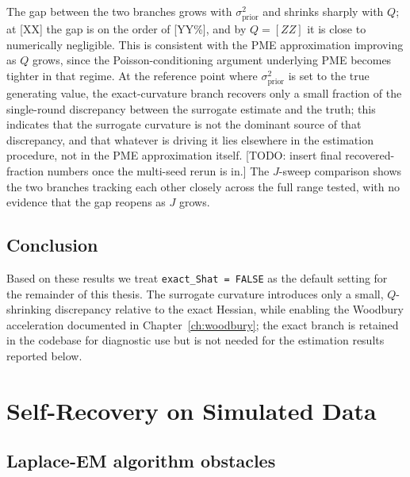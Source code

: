 The gap between the two branches grows with $\sigma^2_{\mathrm{prior}}$ and shrinks sharply with $Q$; at [XX] the gap is on the order of [YY\%], and by $Q = [ZZ]$ it is close to numerically negligible. This is consistent with the PME approximation improving as $Q$ grows, since the Poisson-conditioning argument underlying PME becomes tighter in that regime. At the reference point where $\sigma^2_{\mathrm{prior}}$ is set to the true generating value, the exact-curvature branch recovers only a small fraction of the single-round discrepancy between the surrogate estimate and the truth; this indicates that the surrogate curvature is not the dominant source of that discrepancy, and that whatever is driving it lies elsewhere in the estimation procedure, not in the PME approximation itself. [TODO: insert final recovered-fraction numbers once the multi-seed rerun is in.] The $J$-sweep comparison shows the two branches tracking each other closely across the full range tested, with no evidence that the gap reopens as $J$ grows.



\subsection{Conclusion}

Based on these results we treat \texttt{exact\_Shat = FALSE} as the default setting for the remainder of this thesis. The surrogate curvature introduces only a small, $Q$-shrinking discrepancy relative to the exact Hessian, while enabling the Woodbury acceleration documented in Chapter~\ref{ch:woodbury}; the exact branch is retained in the codebase for diagnostic use but is not needed for the estimation results reported below.


\section{Self-Recovery on Simulated Data}
\label{sec:sim-recovery}

\subsection{Laplace-EM algorithm obstacles}
\label{subsec:obstacle-lap-em}

